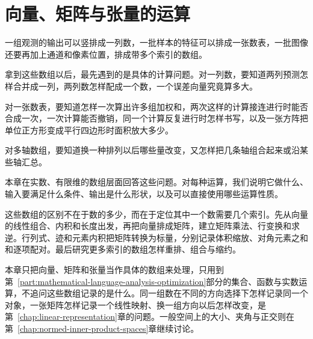 \chapter{向量、矩阵与张量的运算}
\label{chap:linear-operations}

一组观测的输出可以竖排成一列数，一批样本的特征可以排成一张数表，一批图像还要再加上通道和像素位置，排成带多个索引的数组。

拿到这些数组以后，最先遇到的是具体的计算问题。对一列数，要知道两列预测怎样合并成一列，两列数怎样配成一个数，一个误差向量究竟算多大。

对一张数表，要知道怎样一次算出许多组加权和，两次这样的计算接连进行时能否合成一次，一次计算能否撤销，同一个计算反复进行时怎样书写，以及一张方阵把单位正方形变成平行四边形时面积放大多少。

对多轴数组，要知道换一种排列以后哪些量改变，又怎样把几条轴组合起来或沿某些轴汇总。

本章在实数、有限维的数组层面回答这些问题。对每种运算，我们说明它做什么、输入要满足什么条件、输出是什么形状，以及可以直接使用哪些运算性质。

这些数组的区别不在于数的多少，而在于定位其中一个数需要几个索引。先从向量的线性组合、内积和长度出发，再把向量排成矩阵，建立矩阵乘法、行变换和求逆。行列式、迹和元素内积把矩阵转换为标量，分别记录体积缩放、对角元素之和和逐项配对。最后研究更多索引的数组怎样重排、组合与缩约。

本章只把向量、矩阵和张量当作具体的数组来处理，只用到第~\ref{part:mathematical-language-analysis-optimization}部分的集合、函数与实数运算，不追问这些数组记录的是什么。同一组数在不同的方向选择下怎样记录同一个对象，一张矩阵怎样记录一个线性映射、换一组方向以后怎样改变，是第~\ref{chap:linear-representation}章的问题。一般空间上的大小、夹角与正交则在第~\ref{chap:normed-inner-product-spaces}章继续讨论。






